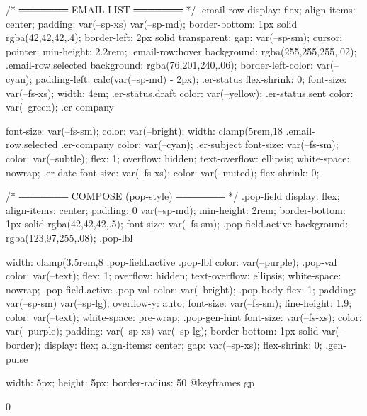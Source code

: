 {{{{{{{{{/* ═══════ EMAIL LIST ═══════ */
.email-row {
  display: flex; align-items: center;
  padding: var(--sp-xs) var(--sp-md);
  border-bottom: 1px solid rgba(42,42,42,.4);
  border-left: 2px solid transparent;
  gap: var(--sp-sm); cursor: pointer; min-height: 2.2rem;
}
.email-row:hover { background: rgba(255,255,255,.02); }
.email-row.selected { background: rgba(76,201,240,.06); border-left-color: var(--cyan); padding-left: calc(var(--sp-md) - 2px); }
.er-status { flex-shrink: 0; font-size: var(--fs-xs); width: 4em; }
.er-status.draft { color: var(--yellow); }
.er-status.sent  { color: var(--green); }
.er-company { font-size: var(--fs-sm); color: var(--bright); width: clamp(5rem,18%
.email-row.selected .er-company { color: var(--cyan); }
.er-subject { font-size: var(--fs-sm); color: var(--subtle); flex: 1; overflow: hidden; text-overflow: ellipsis; white-space: nowrap; }
.er-date { font-size: var(--fs-xs); color: var(--muted); flex-shrink: 0; }

/* ═══════ COMPOSE (pop-style) ═══════ */
.pop-field {
  display: flex; align-items: center;
  padding: 0 var(--sp-md); min-height: 2rem;
  border-bottom: 1px solid rgba(42,42,42,.5); font-size: var(--fs-sm);
}
.pop-field.active { background: rgba(123,97,255,.08); }
.pop-lbl { width: clamp(3.5rem,8%
.pop-field.active .pop-lbl { color: var(--purple); }
.pop-val { color: var(--text); flex: 1; overflow: hidden; text-overflow: ellipsis; white-space: nowrap; }
.pop-field.active .pop-val { color: var(--bright); }
.pop-body { flex: 1; padding: var(--sp-sm) var(--sp-lg); overflow-y: auto; font-size: var(--fs-sm); line-height: 1.9; color: var(--text); white-space: pre-wrap; }
.pop-gen-hint { font-size: var(--fs-xs); color: var(--purple); padding: var(--sp-xs) var(--sp-lg); border-bottom: 1px solid var(--border); display: flex; align-items: center; gap: var(--sp-xs); flex-shrink: 0; }
.gen-pulse { width: 5px; height: 5px; border-radius: 50%
@keyframes gp { 0%

}}}}}}}}}}}}}
